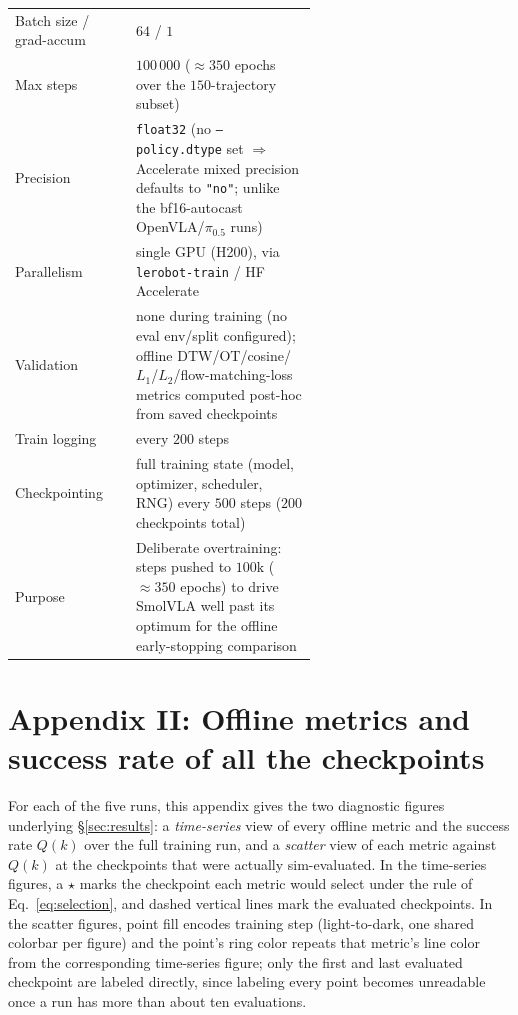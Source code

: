 \documentclass[english,12pt,a4paper,pdftex,elec,utf8]{aaltothesis}
\begin{document}
\begin{table}[t]
\begin{tabular}{@{}l p{0.60\linewidth}@{}}
    Batch size / grad-accum    & $64$ / $1$ \\
    Max steps                  & $100\,000$ ($\approx 350$ epochs over the $150$-trajectory subset) \\
    Precision                   & \texttt{float32} (no \texttt{--policy.dtype} set $\Rightarrow$ Accelerate mixed precision defaults to \texttt{"no"}; unlike the bf16-autocast OpenVLA/$\pi_{0.5}$ runs) \\
    Parallelism                 & single GPU (H200), via \texttt{lerobot-train} / HF Accelerate \\
    \midrule
    Validation                  & none during training (no eval env/split configured); offline DTW/OT/cosine/$L_1$/$L_2$/flow-matching-loss metrics computed post-hoc from saved checkpoints \\
    Train logging                & every $200$ steps \\
    Checkpointing                & full training state (model, optimizer, scheduler, RNG) every $500$ steps ($200$ checkpoints total) \\
    Purpose                     & Deliberate overtraining: steps pushed to $100\text{k}$ ($\approx 350$ epochs) to drive SmolVLA well past its optimum for the offline early-stopping comparison \\
    \bottomrule
  \end{tabular}
\end{table}


\clearpage
\section{Appendix II: Offline metrics and success rate of all the checkpoints}
\label{app:figures}

For each of the five runs, this appendix gives the two diagnostic figures underlying
\S\ref{sec:results}: a \emph{time-series} view of every offline metric and the success rate
$Q(k)$ over the full training run, and a \emph{scatter} view of each metric against $Q(k)$ at
the checkpoints that were actually sim-evaluated. In the time-series figures, a $\star$ marks
the checkpoint each metric would select under the rule of Eq.~\ref{eq:selection}, and dashed
vertical lines mark the evaluated checkpoints. In the scatter figures, point fill encodes
training step (light-to-dark, one shared colorbar per figure) and the point's ring color repeats
that metric's line color from the corresponding time-series figure; only the first and last
evaluated checkpoint are labeled directly, since labeling every point becomes unreadable once a
run has more than about ten evaluations.
\end{document}
